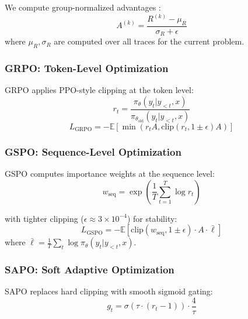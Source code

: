 \documentclass[11pt]{article}
\begin{document}
We compute group-normalized advantages \citep{shao2024deepseekmath}:
\begin{equation}
    A^{(k)} = \frac{R^{(k)} - \mu_R}{\sigma_R + \epsilon}
\end{equation}
where $\mu_R, \sigma_R$ are computed over all traces for the current problem.

\subsubsection{GRPO: Token-Level Optimization}

GRPO applies PPO-style clipping at the token level:
\begin{equation}
    r_t = \frac{\pi_\theta(y_t | y_{<t}, x)}{\pi_{\theta_{\text{old}}}(y_t | y_{<t}, x)}
\end{equation}
\begin{equation}
    L_{\text{GRPO}} = -\mathbb{E}\left[\min(r_t A, \text{clip}(r_t, 1\pm\epsilon) A)\right]
\end{equation}

\subsubsection{GSPO: Sequence-Level Optimization}

GSPO \citep{liu2025gspo} computes importance weights at the sequence level:
\begin{equation}
    w_{\text{seq}} = \exp\left(\frac{1}{T}\sum_{t=1}^{T} \log r_t\right)
\end{equation}

with tighter clipping ($\epsilon \approx 3 \times 10^{-4}$) for stability:
\begin{equation}
    L_{\text{GSPO}} = -\mathbb{E}\left[\text{clip}(w_{\text{seq}}, 1\pm\epsilon) \cdot A \cdot \bar{\ell}\right]
\end{equation}
where $\bar{\ell} = \frac{1}{T}\sum_t \log \pi_\theta(y_t | y_{<t}, x)$.

\subsubsection{SAPO: Soft Adaptive Optimization}

SAPO \citep{liu2025sapo} replaces hard clipping with smooth sigmoid gating:
\begin{equation}
    g_t = \sigma(\tau \cdot (r_t - 1)) \cdot \frac{4}{\tau}
\end{equation}
\end{document}

